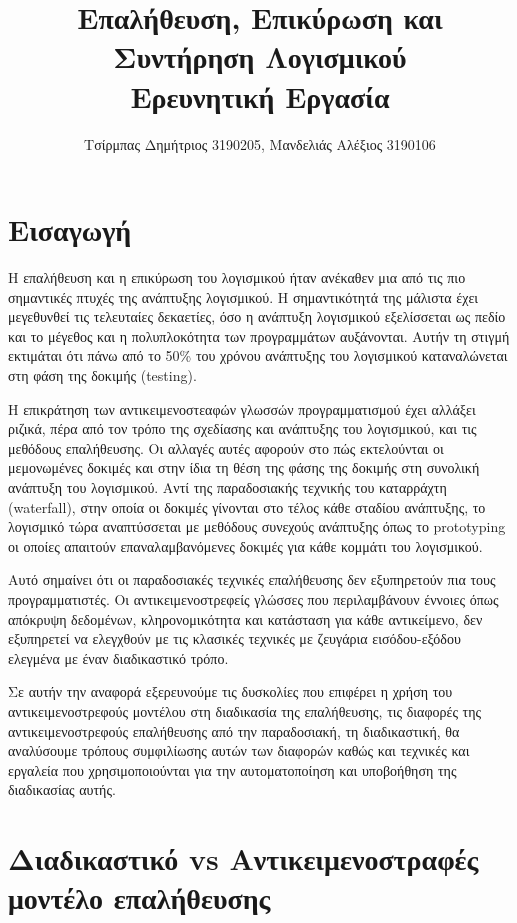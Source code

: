 \documentclass[12pt]{article}
\title{Επαλήθευση, Επικύρωση και Συντήρηση Λογισμικού \\\large Ερευνητική Εργασία}
\author{Τσίρμπας Δημήτριος 3190205, Μανδελιάς Αλέξιος 3190106}
\begin{document}
\maketitle

\section{Εισαγωγή}

Η επαλήθευση και η επικύρωση του λογισμικού ήταν ανέκαθεν μια από τις πιο σημαντικές πτυχές της ανάπτυξης λογισμικού. Η σημαντικότητά της μάλιστα έχει μεγεθυνθεί τις τελευταίες δεκαετίες, όσο η ανάπτυξη λογισμικού εξελίσσεται ως πεδίο και το μέγεθος και η πολυπλοκότητα των προγραμμάτων αυξάνονται. Αυτήν τη στιγμή εκτιμάται ότι πάνω από το 50\% του χρόνου ανάπτυξης του λογισμικού καταναλώνεται στη φάση της δοκιμής (testing).

\par Η επικράτηση των αντικειμενοστεαφών γλωσσών προγραμματισμού έχει αλλάξει ριζικά, πέρα από τον τρόπο της σχεδίασης και ανάπτυξης του λογισμικού, και τις μεθόδους επαλήθευσης. Οι αλλαγές αυτές αφορούν στο πώς εκτελούνται οι μεμονωμένες δοκιμές και στην ίδια τη θέση της φάσης της δοκιμής στη συνολική ανάπτυξη του λογισμικού. Αντί της παραδοσιακής τεχνικής του καταρράχτη (waterfall), στην οποία οι δοκιμές γίνονται στο τέλος κάθε σταδίου ανάπτυξης, το λογισμικό τώρα αναπτύσσεται με μεθόδους συνεχούς ανάπτυξης όπως το prototyping οι οποίες απαιτούν επαναλαμβανόμενες δοκιμές για κάθε κομμάτι του λογισμικού.

\par Αυτό σημαίνει ότι οι παραδοσιακές τεχνικές επαλήθευσης δεν εξυπηρετούν πια τους προγραμματιστές. Οι αντικειμενοστρεφείς γλώσσες που περιλαμβάνουν έννοιες όπως απόκρυψη δεδομένων, κληρονομικότητα και κατάσταση για κάθε αντικείμενο, δεν εξυπηρετεί να ελεγχθούν με τις κλασικές τεχνικές με ζευγάρια εισόδου-εξόδου ελεγμένα με έναν διαδικαστικό τρόπο.

\par Σε αυτήν την αναφορά εξερευνούμε τις δυσκολίες που επιφέρει η χρήση του αντικειμενοστρεφούς μοντέλου στη διαδικασία της επαλήθευσης, τις διαφορές της αντικειμενοστρεφούς επαλήθευσης από την παραδοσιακή, τη διαδικαστική, θα αναλύσουμε τρόπους συμφιλίωσης αυτών των διαφορών καθώς και τεχνικές και εργαλεία που χρησιμοποιούνται για την αυτοματοποίηση και υποβοήθηση της διαδικασίας αυτής. 

\section{Διαδικαστικό vs Αντικειμενοστραφές μοντέλο επαλήθευσης}
\end{document}
